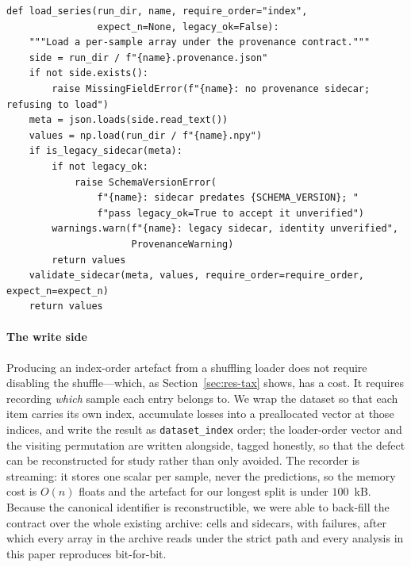 \documentclass[a4paper,fleqn]{cas-sc}
\begin{document}
\begin{lstlisting}[caption={The read side of the contract. The default is to
require index order and full validation, so a positional join cannot be written by
accident; an order-symmetric consumer must say so explicitly, and a pre-contract
artefact must be opted into explicitly.},label={lst:contract}]
def load_series(run_dir, name, require_order="index",
                expect_n=None, legacy_ok=False):
    """Load a per-sample array under the provenance contract."""
    side = run_dir / f"{name}.provenance.json"
    if not side.exists():
        raise MissingFieldError(f"{name}: no provenance sidecar; refusing to load")
    meta = json.loads(side.read_text())
    values = np.load(run_dir / f"{name}.npy")
    if is_legacy_sidecar(meta):
        if not legacy_ok:
            raise SchemaVersionError(
                f"{name}: sidecar predates {SCHEMA_VERSION}; "
                f"pass legacy_ok=True to accept it unverified")
        warnings.warn(f"{name}: legacy sidecar, identity unverified",
                      ProvenanceWarning)
        return values
    validate_sidecar(meta, values, require_order=require_order, expect_n=expect_n)
    return values
\end{lstlisting}

\paragraph{The write side}
Producing an index-order artefact from a shuffling loader does not require
disabling the shuffle---which, as Section~\ref{sec:res-tax} shows, has a cost. It
requires recording \emph{which} sample each entry belongs to. We wrap the dataset
so that each item carries its own index, accumulate losses into a preallocated
vector at those indices, and write the result as \texttt{dataset\_index} order; the
loader-order vector and the visiting permutation are written alongside, tagged
honestly, so that the defect can be reconstructed for study rather than only
avoided. The recorder is streaming: it stores one scalar per sample, never the
predictions, so the memory cost is $O(n)$ floats and the artefact for our longest
split is under $100$~kB. Because the canonical identifier is reconstructible, we
were able to back-fill the contract over the whole existing archive:
\NumBackfillDirs{} cells and \NumBackfillSidecars{} sidecars, with
\NumBackfillFailures{} failures, after which every array in the archive reads under
the strict path and every analysis in this paper reproduces bit-for-bit.
\end{document}
